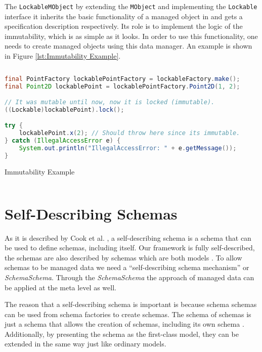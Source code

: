 The \texttt{LockableMObject} by extending the \texttt{MObject} and implementing the \texttt{Lockable} interface it inherits the basic functionality of a managed object in and gets a specification description respectively.
Its role is to implement the logic of the immutability, which is as simple as it looks.
In order to use this functionality, one needs to create managed objects using this data manager.
An example is shown in Figure \ref{lst:Immutability Example}.

\begin{sourcecode} [H]
	\begin{lstlisting}[language=Java, escapechar=|]
final PointFactory lockablePointFactory = lockableFactory.make();
final Point2D lockablePoint = lockablePointFactory.Point2D(1, 2);

// It was mutable until now, now it is locked (immutable).
((Lockable)lockablePoint).lock();

try {
	lockablePoint.x(2); // Should throw here since its immutable.
} catch (IllegalAccessError e) {
	System.out.println("IllegalAccessError: " + e.getMessage());
}
	\end{lstlisting}
	\caption{Immutability Example}
	\label{lst:Immutability Example}
\end{sourcecode}

\section{Self-Describing Schemas}\label{Self-Describing Schemas}
As it is described by Cook et al. \cite{loh2012managed}, a self-describing schema is a schema that can be used to define schemas, including itself.
Our framework is fully self-described, the schemas are also described by schemas which are both models \cite{kurtev2006model}. 
To allow schemas to be managed data we need a ``self-describing schema mechanism'' or \textit{SchemaSchema}.
Through the \textit{SchemaSchema} the approach of managed data can be applied at the meta level as well.

The reason that a self-describing schema is important is because schema schemas can be used from schema factories to create schemas.
The schema of schemas is just a schema that allows the creation of schemas, including its own schema \cite{storm2012object}.
Additionally, by presenting the schema as the first-class model\cite{kurtev2006model}, they can be extended in the same way just like ordinary models.

